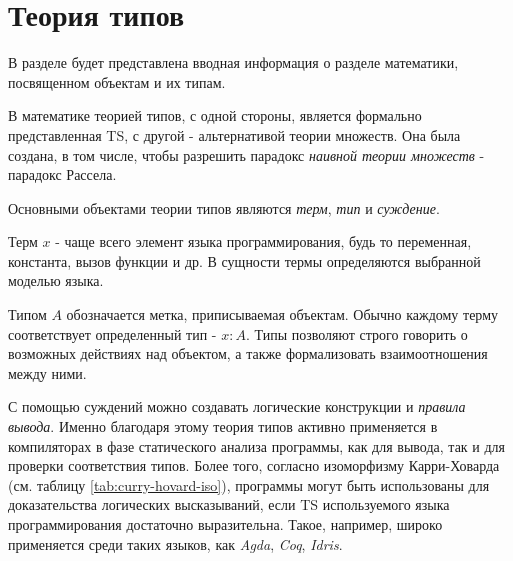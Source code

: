 \chapter{Теория типов}
\label{ch:type_theory}

В разделе будет представлена вводная информация о разделе математики, посвященном объектам и их типам.

В математике теорией типов\cite{TypeTheoryBook}, с одной стороны, является формально представленная \gls{TS}, с другой - альтернативой теории множеств.
Она была создана, в том числе, чтобы разрешить парадокс \textit{наивной теории множеств} - парадокс Рассела. \cite{TheFoundationsOfArithmetic}

Основными объектами теории типов являются \textit{терм}, \textit{тип} и \textit{суждение}.

Терм $x$ - чаще всего элемент языка программирования, будь то переменная, константа, вызов функции и др.
В сущности термы определяются выбранной моделью языка.

Типом $A$ обозначается метка, приписываемая объектам.
Обычно каждому терму соответствует определенный тип - $x: A$.
Типы позволяют строго говорить о возможных действиях над объектом, а также формализовать взаимоотношения между ними.

С помощью суждений можно создавать логические конструкции и \textit{правила вывода}.
Именно благодаря этому теория типов активно применяется в компиляторах в фазе статического анализа программы, как для вывода, так и для проверки соответствия типов.
Более того, согласно изоморфизму Карри-Ховарда\cite{TypeTheoryArticle} (см. таблицу \ref{tab:curry-hovard-iso}), программы могут быть использованы для доказательства логических высказываний, если \gls{TS} используемого языка программирования достаточно выразительна.
Такое, например, широко применяется среди таких языков, как \textit{Agda}, \textit{Coq}, \textit{Idris}.

